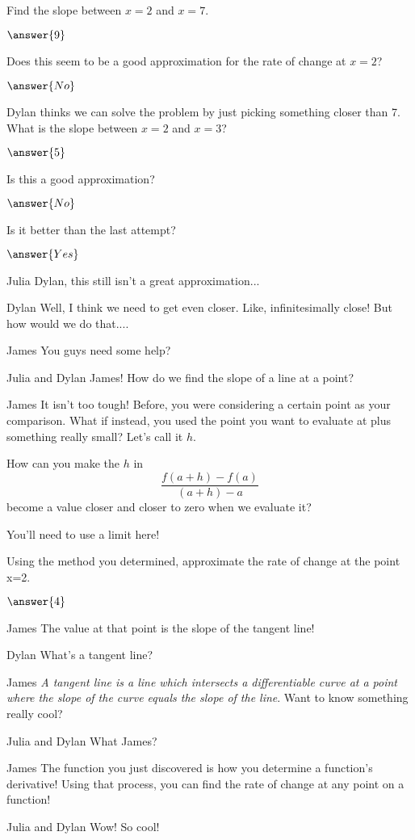 \documentclass{ximera}
\begin{document}
\begin{question}
Find the slope between $x = 2$ and $x = 7$.

$\answer{9}$

Does this seem to be a good approximation for the rate of change at $x = 2$?

$\answer{No}$

Dylan thinks we can solve the problem by just picking something closer than 7. What is the slope between $x = 2$ and $x = 3$?

$\answer{5}$

Is this a good approximation?

$\answer{No}$

Is it better than the last attempt?

$\answer{Yes}$
\end{question}
\begin{dialogue}
\item[Julia] Dylan, this still isn't a great approximation...
\item[Dylan] Well, I think we need to get even closer. Like, infinitesimally close! But how would we do that....
\item[James] You guys need some help?
\item[Julia and Dylan] James! How do we find the slope of a line at a point?
\item[James] It isn't too tough! Before, you were considering a certain point as your comparison. What if instead, you used the point you want to evaluate at plus something really small? Let's call it $h$.
\end{dialogue}
\begin{question}
How can you make the $h$ in $$\frac{f(a+h)-f(a)}{(a+h)-a}$$ become a value closer and closer to zero when we evaluate it?
\begin{hint}
You'll need to use a limit here!
\end{hint}
\begin{freeResponse}
\end{freeResponse}

Using the method you determined, approximate the rate of change at the point x=2.

$\answer{4}$

\end{question}
\begin{dialogue}
\item[James] The value at that point is the slope of the tangent line!
\item[Dylan] What's a tangent line?
\item[James] \textit{A tangent line is a line which intersects a differentiable curve at a point where the slope of the curve equals the slope of the line}. Want to know something really cool?
\item[Julia and Dylan] What James?
\item[James] The function you just discovered is how you determine a function's derivative! Using that process, you can find the rate of change at any point on a function!
\item[Julia and Dylan] Wow! So cool!
\end{dialogue}
\end{document}
